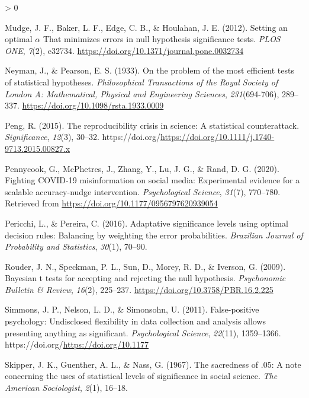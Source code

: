 \documentclass[
  english,
  ,man, a4paper,floatsintext]{apa6}
\newlength{\cslhangindent}
\newenvironment{CSLReferences}[2] %
 {%
  \setlength{\parindent}{0pt}
  \ifodd #1 \everypar{\setlength{\hangindent}{\cslhangindent}}\ignorespaces\fi
  \ifnum #2 > 0
  \setlength{\parskip}{#2\baselineskip}
  \fi
 }%
 {}
\begin{document}
\begin{CSLReferences}{1}{0}
\leavevmode\hypertarget{ref-mudge_setting_2012}{}%
Mudge, J. F., Baker, L. F., Edge, C. B., \& Houlahan, J. E. (2012). Setting an optimal {\(\alpha\)} {That minimizes errors} in {null hypothesis significance tests}. \emph{PLOS ONE}, \emph{7}(2), e32734. \url{https://doi.org/10.1371/journal.pone.0032734}

\leavevmode\hypertarget{ref-neyman_problem_1933}{}%
Neyman, J., \& Pearson, E. S. (1933). On the problem of the most efficient tests of statistical hypotheses. \emph{Philosophical Transactions of the Royal Society of London A: Mathematical, Physical and Engineering Sciences}, \emph{231}(694-706), 289--337. \url{https://doi.org/10.1098/rsta.1933.0009}

\leavevmode\hypertarget{ref-peng2015reproducibility}{}%
Peng, R. (2015). The reproducibility crisis in science: A statistical counterattack. \emph{Significance}, \emph{12}(3), 30--32. https://doi.org/\url{https://doi.org/10.1111/j.1740-9713.2015.00827.x}

\leavevmode\hypertarget{ref-pennycook2020fighting}{}%
Pennycook, G., McPhetres, J., Zhang, Y., Lu, J. G., \& Rand, D. G. (2020). Fighting COVID-19 misinformation on social media: Experimental evidence for a scalable accuracy-nudge intervention. \emph{Psychological Science}, \emph{31}(7), 770--780. Retrieved from \url{https://doi.org/10.1177/0956797620939054}

\leavevmode\hypertarget{ref-pericchi2016adaptative}{}%
Pericchi, L., \& Pereira, C. (2016). Adaptative significance levels using optimal decision rules: Balancing by weighting the error probabilities. \emph{Brazilian Journal of Probability and Statistics}, \emph{30}(1), 70--90.

\leavevmode\hypertarget{ref-rouder_bayesian_2009}{}%
Rouder, J. N., Speckman, P. L., Sun, D., Morey, R. D., \& Iverson, G. (2009). Bayesian t tests for accepting and rejecting the null hypothesis. \emph{Psychonomic Bulletin \& Review}, \emph{16}(2), 225--237. \url{https://doi.org/10.3758/PBR.16.2.225}

\leavevmode\hypertarget{ref-simmons2011false}{}%
Simmons, J. P., Nelson, L. D., \& Simonsohn, U. (2011). False-positive psychology: Undisclosed flexibility in data collection and analysis allows presenting anything as significant. \emph{Psychological Science}, \emph{22}(11), 1359--1366. https://doi.org/\url{https://doi.org/10.1177}

\leavevmode\hypertarget{ref-skipper_sacredness_1967}{}%
Skipper, J. K., Guenther, A. L., \& Nass, G. (1967). The sacredness of .05: A note concerning the uses of statistical levels of significance in social science. \emph{The American Sociologist}, \emph{2}(1), 16--18.


\end{CSLReferences}
\end{document}
